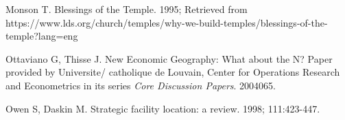 \documentclass[twoside,twocolumn]{article}
\begin{document}
\begin{thebibliography}{99}
Monson T.
\newblock Blessings of the Temple. 1995;
\newblock Retrieved from https://www.lds.org/church/temples/why-we-build-temples/blessings-of-the-temple?lang=eng

Ottaviano G, Thisse J.
\newblock New Economic Geography: What about the N?
\newblock Paper provided by Universite/ catholique de Louvain, Center for Operations Research and Econometrics in its series {\em Core Discussion Papers}. 2004065.

Owen S, Daskin M.
\newblock Strategic facility location: a review.
 1998; 111:423-447.

\end{thebibliography}
\end{document}
